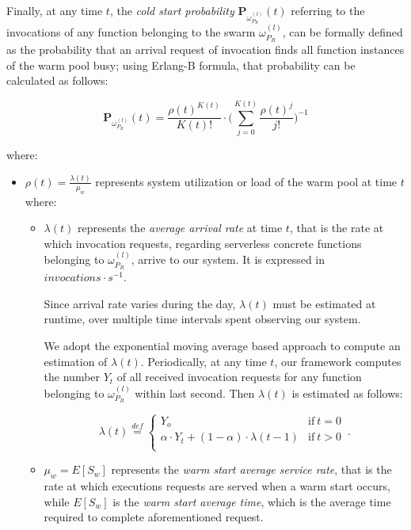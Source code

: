 \documentclass[12pt,a4paper]{report}
\newcommand{\mathDef}{\overset{\textit{def}}{=}}
\begin{document}
Finally, at any time $t$, the \textit{cold start probability} $\textbf{P}_{\omega_{P_R}^{(l)}}(t)$ referring to the invocations of any function belonging to the swarm $\omega_{P_R}^{(l)}$, can be formally defined as the probability that an arrival request of invocation finds all function instances of the warm pool busy; using Erlang-B formula, that probability can be calculated as follows:

\begin{equation}\label{er}
	\displaystyle \textbf{P}_{\omega_{P_R}^{(l)}}(t) = \dfrac{\rho(t)^{K(t)}}{K(t)!} \cdot \Bigg( \displaystyle\sum_{j=0}^{K(t)} \dfrac{\rho(t)^j}{j!}\Bigg)^{-1}
\end{equation}

where:

\begin{itemize}
	
	\item $\displaystyle \rho(t) = \frac{\lambda(t)}{\mu_{w}}$ represents system utilization or load of the warm pool at time $t$ where:
	
	\begin{itemize}
		
		\item $\lambda(t)$ represents the \textit{average arrival rate} at time $t$, that is the rate at which invocation requests, regarding serverless concrete functions belonging to $\omega_{P_R}^{(l)}$, arrive to our system. It is expressed in $invocations \cdot s^{-1}$.
				
		Since arrival rate varies during the day, $\lambda(t)$ must be estimated at runtime, over multiple time intervals spent observing our system.
		
		We adopt the exponential moving average based approach to compute an estimation of $\lambda(t)$. Periodically, at any time $t$, our framework computes the number $Y_t$ of all received invocation requests for any function belonging to $\omega_{P_R}^{(l)}$ within last second. Then $\lambda(t)$ is estimated as follows:
		
		\begin{equation}
			\lambda(t) \mathDef
			\begin{cases}
				Y_o & \text{if}\ t = 0\\ 
				\alpha \cdot Y_t + (1 - \alpha) \cdot \lambda(t-1) & \text{if}\ t > 0\\
				
			\end{cases}\,.
		\end{equation}
		
		\item $\mu_{w} = E[S_w]$ represents the \textit{warm start average service rate}, that is the rate at which executions requests are served when a warm start occurs, while $E[S_w]$ is the \textit{warm start average time}, which is the average time required to complete aforementioned request.
		
	\end{itemize}
	
\end{itemize}
\end{document}
